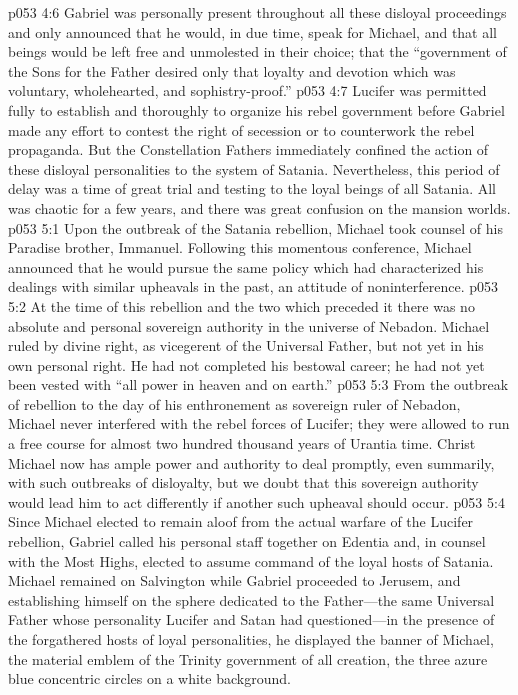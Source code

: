 \vs p053 4:6 Gabriel was personally present throughout all these disloyal proceedings and only announced that he would, in due time, speak for Michael, and that all beings would be left free and unmolested in their choice; that the “government of the Sons for the Father desired only that loyalty and devotion which was voluntary, wholehearted, and sophistry\hyp{}proof.”
\pc \vs p053 4:7 Lucifer was permitted fully to establish and thoroughly to organize his rebel government before Gabriel made any effort to contest the right of secession or to counterwork the rebel propaganda. But the Constellation Fathers immediately confined the action of these disloyal personalities to the system of Satania. Nevertheless, this period of delay was a time of great trial and testing to the loyal beings of all Satania. All was chaotic for a few years, and there was great confusion on the mansion worlds.
\vs p053 5:1 Upon the outbreak of the Satania rebellion, Michael took counsel of his Paradise brother, Immanuel. Following this momentous conference, Michael announced that he would pursue the same policy which had characterized his dealings with similar upheavals in the past, an attitude of noninterference.
\pc \vs p053 5:2 At the time of this rebellion and the two which preceded it there was no absolute and personal sovereign authority in the universe of Nebadon. Michael ruled by divine right, as vicegerent of the Universal Father, but not yet in his own personal right. He had not completed his bestowal career; he had not yet been vested with “all power in heaven and on earth.”
\vs p053 5:3 From the outbreak of rebellion to the day of his enthronement as sovereign ruler of Nebadon, Michael never interfered with the rebel forces of Lucifer; they were allowed to run a free course for almost two hundred thousand years of Urantia time. Christ Michael now has ample power and authority to deal promptly, even summarily, with such outbreaks of disloyalty, but we doubt that this sovereign authority would lead him to act differently if another such upheaval should occur.
\pc \vs p053 5:4 Since Michael elected to remain aloof from the actual warfare of the Lucifer rebellion, Gabriel called his personal staff together on Edentia and, in counsel with the Most Highs, elected to assume command of the loyal hosts of Satania. Michael remained on Salvington while Gabriel proceeded to Jerusem, and establishing himself on the sphere dedicated to the Father---the same Universal Father whose personality Lucifer and Satan had questioned---in the presence of the forgathered hosts of loyal personalities, he displayed the banner of Michael, the material emblem of the Trinity government of all creation, the three azure blue concentric circles on a white background.
